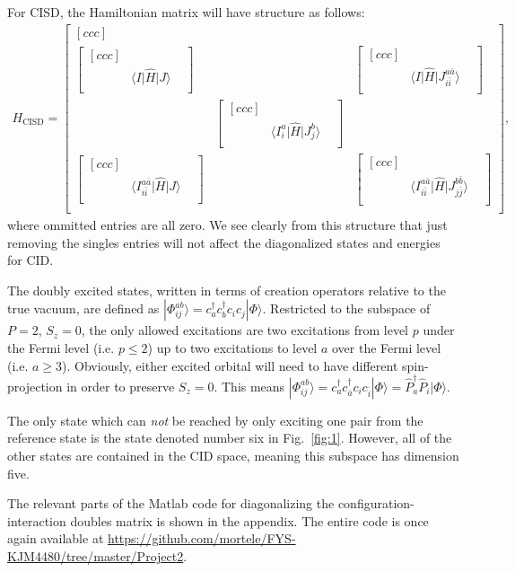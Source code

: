 \documentclass[a4paper]{article}
\newcommand{\bmat}[2]{\begin{bmatrix}[#1] #2 \end{bmatrix}}  %
\newcommand{\fig}[1]{Fig.\ \ref{fig:#1}}
\begin{document}
For CISD, the Hamiltonian matrix will have structure as follows:
\begin{align}
H_\text{CISD} = \bmat{ccc}{\\ \bmat{ccc}{& & \\ & \big\langle I \big| \hat H\big| J \big\rangle & \\ & & } & & \bmat{ccc}{& & \\ & \big\langle I \big| \hat H\big| J_{i\bar i}^{a\bar a} \big\rangle & \\ & & } \\
& \bmat{ccc}{& & \\ & \big\langle I_i^a \big| \hat H\big| J_j^b \big\rangle & \\ & & } & \\
\bmat{ccc}{& & \\ & \big\langle I_{i\bar i}^{a\bar a} \big| \hat H\big| J \big\rangle & \\ & & } & & \bmat{ccc}{& & \\ & \big\langle I_{i\bar i}^{a \bar a} \big| \hat H\big| J_{j\bar j}^{b\bar b} \big\rangle & \\ & & } \\ &},
\end{align} 
where ommitted entries are all zero. We see clearly from this structure that just removing the singles entries will not affect the diagonalized states and energies for CID. 

The doubly excited states, written in terms of creation operators relative to the true vacuum, are defined as $|\Phi_{ij}^{ab}\rangle=c^\dagger_a c^\dagger_b c_i c_j |\Phi\rangle$. Restricted to the subspace of $P=2$, $S_z=0$, the only allowed excitations are two excitations from level $p$ under the Fermi level (i.e. $p\le 2$) up to two excitations to level $a$ over the Fermi level (i.e. $a\ge 3$). Obviously, either excited orbital will need to have different spin-projection in order to preserve $S_z=0$. This means $|\Phi_{ij}^{ab}\rangle=c^\dagger_a c^\dagger_{\bar a} c_i c_{\bar i} |\Phi\rangle = \hat P^\dagger_a \hat P_i |\Phi\rangle$.

The only state which can \emph{not} be reached by only exciting one pair from the reference state is the state denoted number six in \fig{1}. However, all of the other states are contained in the CID space, meaning this subspace has dimension five. 

The relevant parts of the {\sc Matlab} code for diagonalizing the configuration-interaction doubles matrix is shown in the appendix. The entire code is once again available at \url{https://github.com/mortele/FYS-KJM4480/tree/master/Project2}. 
\end{document}

